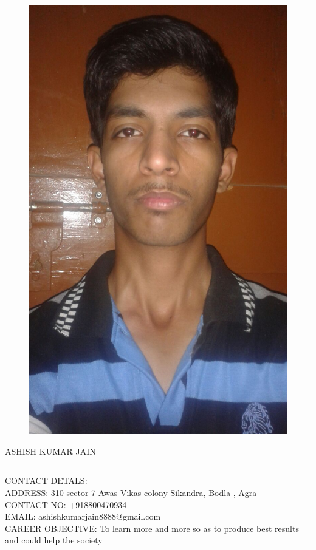 \documentclass[11pt,a4paper]{article}
\begin{document}
\begin{figure}[t]
\includegraphics[width=0.2\linewidth]{pic}

\end{figure}

\textsf{\huge \bigskip ASHISH KUMAR JAIN}
\hrule
\large
\begin{flushleft}
	
	\textsf{CONTACT DETALS}:\\
	\textsf{ADDRESS:} 310 sector-7 Awas Vikas colony Sikandra, Bodla , Agra\\
	\textsf{CONTACT NO:} +918800470934\\
	\textsf{EMAIL:} ashishkumarjain8888@gmail.com\\ 
		\textsf{CAREER OBJECTIVE:}  To learn more and more so as to produce best results and could help the society\\
	
\end{flushleft}

 
\end{document}
